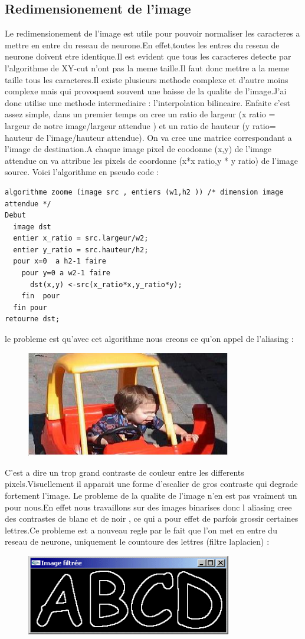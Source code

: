 \subsection{Redimensionement de l'image }
Le redimensionement de l'image est utile pour pouvoir normaliser les caracteres a mettre en entre du reseau de neurone.En effet,toutes les entres du reseau de neurone doivent etre identique.Il est evident que tous les caracteres detecte par l'algorithme de XY-cut n'ont pas la meme taille.Il faut donc mettre a la meme taille tous les caracteres.Il existe plusieurs methode complexe et d'autre moins complexe mais qui provoquent souvent une baisse de la qualite de l'image.J'ai donc utilise une methode intermediaire : l'interpolation bilineaire.
Enfaite c'est assez simple, dans un premier temps on cree un ratio de largeur (x ratio = largeur de notre image/largeur attendue ) et un ratio de hauteur (y ratio= hauteur de l'image/hauteur attendue). On va cree une matrice correspondant a l'image de destination.A chaque image pixel de coodonne (x,y) de l'image attendue on va attribue les pixels de coordonne (x*x ratio,y * y ratio) de l'image source.
Voici l'algorithme en pseudo code :
\begin{lstlisting}
algorithme zoome (image src , entiers (w1,h2 )) /* dimension image attendue */
Debut
  image dst
  entier x_ratio = src.largeur/w2;
  entier y_ratio = src.hauteur/h2;
  pour x=0  a h2-1 faire
    pour y=0 a w2-1 faire
      dst(x,y) <-src(x_ratio*x,y_ratio*y);
    fin  pour
  fin pour
retourne dst; 
\end{lstlisting}
le probleme  est qu'avec cet algorithme nous creons ce qu'on appel de l'aliasing :
\begin{figure}[h]
    \centering
    \includegraphics[width =0.80\textwidth]{aliasing.jpg}
\end{figure}
C'est a dire un trop grand contraste de couleur entre les differents pixels.Visuellement il apparait une forme d'escalier de gros contraste qui degrade fortement l'image. Le probleme de la qualite de l'image n'en est pas vraiment un pour nous.En effet nous travaillons sur des images binarises donc l aliasing cree des contrastes de blanc et de noir , ce qui a pour effet de parfois grossir certaines lettres.Ce probleme est a nouveau regle par le fait que l'on met en entre du reseau de neurone, uniquement le countoure des lettres (filtre laplacien) :
\begin{figure}[h]
    \centering
    \includegraphics[width =0.80\textwidth]{ABCD.jpg}
\end{figure}

